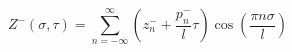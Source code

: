 \begin{equation}
    Z^- (\sigma,\tau) = \sum_{n=-\infty}^{\infty} \left(
                        z_n^- + \frac{p_n^-}{l} \tau \right)
                        \cos\left(\frac{\pi n \sigma}{l}\right)
\end{equation}

